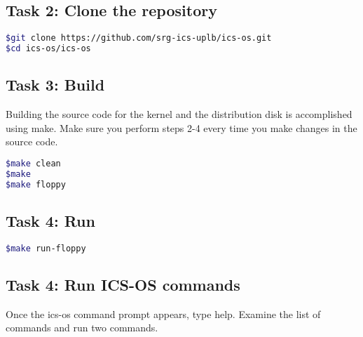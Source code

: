 \documentclass[a4paper, 11pt,oneside]{article}
\begin{document}
\subsection*{Task 2: Clone the repository}
\begin{lstlisting}[language=bash,frame=single] 
$git clone https://github.com/srg-ics-uplb/ics-os.git
$cd ics-os/ics-os
\end{lstlisting}

\subsection*{Task 3: Build}
Building the source code for the kernel and the distribution disk is accomplished using make. Make sure you perform steps 2-4 every time you make changes in the source code.
\begin{lstlisting}[language=bash,frame=single] 
$make clean
$make
$make floppy 
\end{lstlisting}

\subsection*{Task 4: Run}
\begin{lstlisting}[language=bash,frame=single] 
$make run-floppy 
\end{lstlisting}

\subsection*{Task 4: Run ICS-OS commands}
Once the ics-os command prompt appears, type help. 
Examine the list of commands and run two commands.

\end{document}
